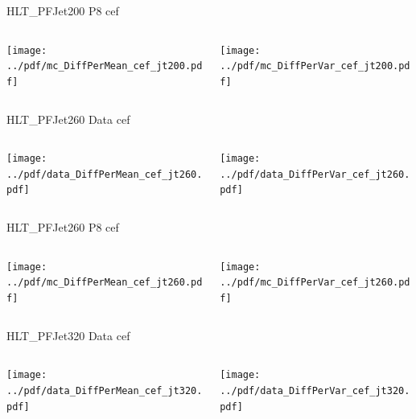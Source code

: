\documentclass[9pt]{beamer}
\begin{document}
\begin{frame}[t]{HLT\_PFJet200 P8 cef}
\begin{columns}[T]
  \begin{column}{.5\textwidth}
  \texttt{[image: ../pdf/mc\_DiffPerMean\_cef\_jt200.pdf]}
  \end{column}
  \begin{column}{.5\textwidth}
  \texttt{[image: ../pdf/mc\_DiffPerVar\_cef\_jt200.pdf]}
  \end{column}
\end{columns}
\end{frame}

\begin{frame}[t]{HLT\_PFJet260 Data cef}
\begin{columns}[T]
  \begin{column}{.5\textwidth}
  \texttt{[image: ../pdf/data\_DiffPerMean\_cef\_jt260.pdf]}
  \end{column}
  \begin{column}{.5\textwidth}
  \texttt{[image: ../pdf/data\_DiffPerVar\_cef\_jt260.pdf]}
  \end{column}
\end{columns}
\end{frame}

\begin{frame}[t]{HLT\_PFJet260 P8 cef}
\begin{columns}[T]
  \begin{column}{.5\textwidth}
  \texttt{[image: ../pdf/mc\_DiffPerMean\_cef\_jt260.pdf]}
  \end{column}
  \begin{column}{.5\textwidth}
  \texttt{[image: ../pdf/mc\_DiffPerVar\_cef\_jt260.pdf]}
  \end{column}
\end{columns}
\end{frame}

\begin{frame}[t]{HLT\_PFJet320 Data cef}
\begin{columns}[T]
  \begin{column}{.5\textwidth}
  \texttt{[image: ../pdf/data\_DiffPerMean\_cef\_jt320.pdf]}
  \end{column}
  \begin{column}{.5\textwidth}
  \texttt{[image: ../pdf/data\_DiffPerVar\_cef\_jt320.pdf]}
  \end{column}
\end{columns}
\end{frame}
\end{document}
